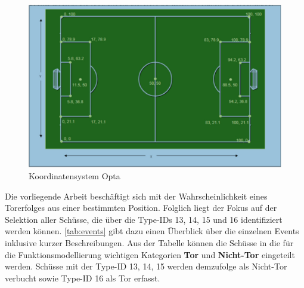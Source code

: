 \begin{figure}[H]
\centering
\includegraphics[scale=0.4]{se-wa-jpg/opta_pitch}
\caption[Koordinatensystem Opta]{Koordinatensystem Opta\protect\footnotemark}
\label{opta_pitch}
\end{figure}
\enlargethispage{2\baselineskip} 
Die vorliegende Arbeit beschäftigt sich mit der Wahrscheinlichkeit eines Torerfolges aus einer bestimmten Position. Folglich liegt der Fokus auf der Selektion aller Schüsse, die über die Type-IDs \textsf{13, 14, 15} und \textsf{16} identifiziert werden können. \vref{tab:events} gibt dazu einen Überblick über die einzelnen Events inklusive kurzer Beschreibungen. Aus der Tabelle können die Schüsse in die für die Funktionsmodellierung wichtigen Kategorien \textbf{Tor} und \textbf{Nicht-Tor} eingeteilt werden. Schüsse mit der Type-ID \textsf{13, 14, 15} werden demzufolge als Nicht-Tor verbucht sowie Type-ID \textsf{16} als Tor erfasst.

